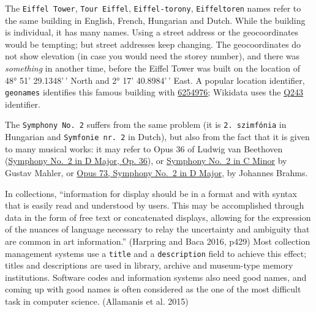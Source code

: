 \documentclass[
  letterpaper,
  DIV=11,
  numbers=noendperiod]{scrreprt}
\begin{document}
The \texttt{Eiffel\ Tower}, \texttt{Tour\ Eiffel},
\texttt{Eiffel-torony}, \texttt{Eiffeltoren} names refer to the same
building in English, French, Hungarian and Dutch. While the building is
individual, it has many names. Using a street address or the
geocoordinates would be tempting; but street addresses keep changing.
The geocoordinates do not show elevation (in case you would need the
storey number), and there was \emph{something} in another time, before
the Eiffel Tower was built on the location of 48° 51' 29.1348'\,' North
and 2° 17' 40.8984'\,' East. A popular location identifier,
\texttt{geonames} identifies this famous building with
\href{https://www.geonames.org/6254976/tour-eiffel.html}{6254976};
Wikidata uses the \href{https://www.wikidata.org/wiki/Q243}{Q243}
identifier.

The \texttt{Symphony\ No.\ 2} suffers from the same problem (it is
\texttt{2.\ szimfónia} in Hungarian and \texttt{Symfonie\ nr.\ 2} in
Dutch), but also from the fact that it is given to many musical works:
it may refer to Opus 36 of Ludwig van Beethoven
(\href{https://www.wikidata.org/wiki/Q210451}{Symphony No.~2 in D Major,
Op. 36}), or \href{https://www.wikidata.org/wiki/Q210549}{Symphony No.~2
in C Minor} by Gustav Mahler, or
\href{https://www.wikidata.org/wiki/Q210469}{Opus 73, Symphony No.~2 in
D Major}, by Johannes Brahms.

In collections, ``information for display should be in a format and with
syntax that is easily read and understood by users. This may be
accomplished through data in the form of free text or concatenated
displays, allowing for the expression of the nuances of language
necessary to relay the uncertainty and ambiguity that are common in art
information.'' (Harpring and Baca 2016, p429) Most collection management
systems use a \texttt{title} and a \texttt{description} field to achieve
this effect; titles and descriptions are used in library, archive and
museum-type memory institutions. Software codes and information systems
also need good names, and coming up with good names is often considered
as the one of the most difficult task in computer science. (Allamanis et
al. 2015)
\end{document}
